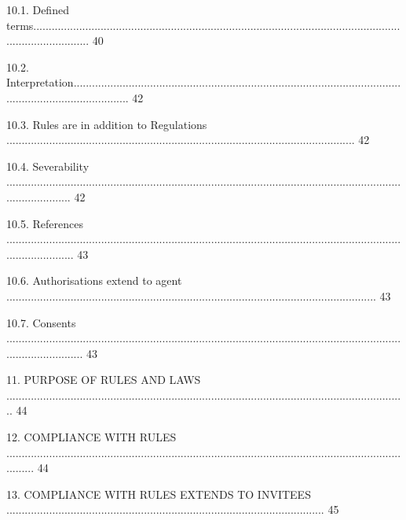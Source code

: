 \documentclass{article}
\begin{document}
{\fontsize{9.99}{1}10.1. Defined terms................................................................................................................................................... 40 }

{\fontsize{9.99}{1}10.2. Interpretation................................................................................................................................................... 42 }

{\fontsize{9.99}{1}10.3. Rules are in addition to Regulations .................................................................................................................. 42 }

{\fontsize{9.99}{1}10.4. Severability ...................................................................................................................................................... 42 }

{\fontsize{9.99}{1}10.5. References ....................................................................................................................................................... 43 }

{\fontsize{9.99}{1}10.6. Authorisations extend to agent ......................................................................................................................... 43 }

{\fontsize{9.99}{1}10.7. Consents .......................................................................................................................................................... 43 }

{\fontsize{9.99}{1}11. PURPOSE OF RULES AND LAWS ................................................................................................................................... 44 }

{\fontsize{9.99}{1}12. COMPLIANCE WITH RULES .......................................................................................................................................... 44 }

\newpage


















{\fontsize{9.99}{1}13. COMPLIANCE WITH RULES EXTENDS TO INVITEES ........................................................................................................ 45 }
\end{document}
